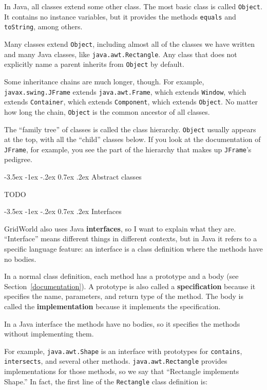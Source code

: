 \documentclass[12pt]{book}
\makeatletter
\renewcommand{\section}{\@startsection {section}{1}{\z@}%
    {-3.5ex \@plus -1ex \@minus -.2ex}%
    {0.7ex \@plus.2ex}%
    {\normalfont\Large\bfseries}}
\theoremstyle{exercise}
\newcommand{\java}[1]{\lstinline{#1}} %
\makeatother
\begin{document}
In Java, all classes extend some other class.
The most basic class is called \java{Object}.
It contains no instance variables, but it provides the methods \java{equals} and \java{toString}, among others.

Many classes extend \java{Object}, including almost all of the classes we have written and many Java classes, like \java{java.awt.Rectangle}.
Any class that does not explicitly name a parent inherits from \java{Object} by default.

Some inheritance chains are much longer, though.
For example, \java{javax.swing.JFrame} extends \java{java.awt.Frame}, which extends \java{Window}, which extends \java{Container}, which extends \java{Component}, which extends \java{Object}.
No matter how long the chain, \java{Object} is the common ancestor of all classes.

The ``family tree'' of classes is called the class hierarchy.
\java{Object} usually appears at the top, with all the ``child'' classes below.
If you look at the documentation of \java{JFrame}, for example, you see the part of the hierarchy that makes up \java{JFrame}'s pedigree.


\section{Abstract classes}

TODO


\section{Interfaces}

GridWorld also uses Java {\bf interfaces}, so I want to explain what they are.
``Interface'' means different things in different contexts, but in Java it refers to a specific language feature: an interface is a class definition where the methods have no bodies.

In a normal class definition, each method has a prototype and a body (see Section~\ref{documentation}).
A prototype is also called a {\bf specification} because it specifies the name, parameters, and return type of the method.
The body is called the {\bf implementation} because it implements the specification.

In a Java interface the methods have no bodies, so it specifies the methods without implementing them.

For example, \java{java.awt.Shape} is an interface with prototypes for \java{contains}, \java{intersects}, and several other methods.
\java{java.awt.Rectangle} provides implementations for those methods, so we say that ``Rectangle implements Shape.''
In fact, the first line of the \java{Rectangle} class definition is:
\end{document}
